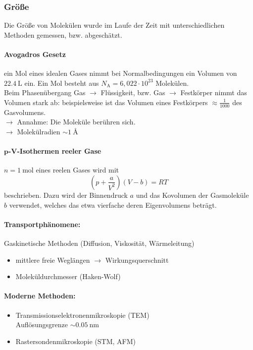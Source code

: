     \subsubsection{Größe}
    Die Größe von Molekülen wurde im Laufe der Zeit mit unterschiedlichen Methoden gemessen, bzw. abgeschätzt.
    \paragraph{Avogadros Gesetz} ein Mol eines idealen Gases nimmt bei Normalbedingungen ein Volumen  von $\SI{22,4}{\liter}$ ein. Ein Mol besteht aus $N_{\text{A}} = 6,022 \cdot 10^{23}$ Molekülen.\\[1ex]
    Beim Phasenübergang Gas $\to$ Flüssigkeit, bzw. Gas $\to$ Festkörper nimmt das Volumen stark ab: beispielsweise ist das Volumen eines Festkörpers $\approx\frac1{1000}$ des Gasvolumens.\\
    $\to$ Annahme: Die Moleküle berühren sich.\\
    $\to $ Molekülradien $\sim \SI{1}{\angstrom}$
    
    \paragraph{$\bm{p}$-$\bm{V}$-Isothermen reeler Gase} $n=\SI{1}{\mol}$ eines reelen Gases wird mit 
        \begin{equation}
            \label{1.1}
            \left( p + \frac{a}{V^2} \right) \left( V-b \right) = RT
        \end{equation}
        beschrieben. Dazu wird der Binnendruck $a$ und das Kovolumen der Gasmoleküle $b$ verwendet, welches das etwa vierfache deren Eigenvolumens beträgt.
    \paragraph{Transportphänomene:}
        Gaskinetische Methoden (Diffusion, Viskosität, Wärmeleitung)
        \begin{itemize}[label=$\to$]
            \item mittlere freie Weglängen $\to $ Wirkungsquerschnitt
            \item Moleküldurchmesser (Haken-Wolf)
        \end{itemize}
    \paragraph{Moderne Methoden:}
        \begin{itemize}
            \item Transmissionselektronenmikroskopie (TEM)\\ Auflösungsgrenze $\sim \SI{0,05}{\nano\meter}$
            \item Rastersondenmikroskopie (STM, AFM)
        \end{itemize}
    
